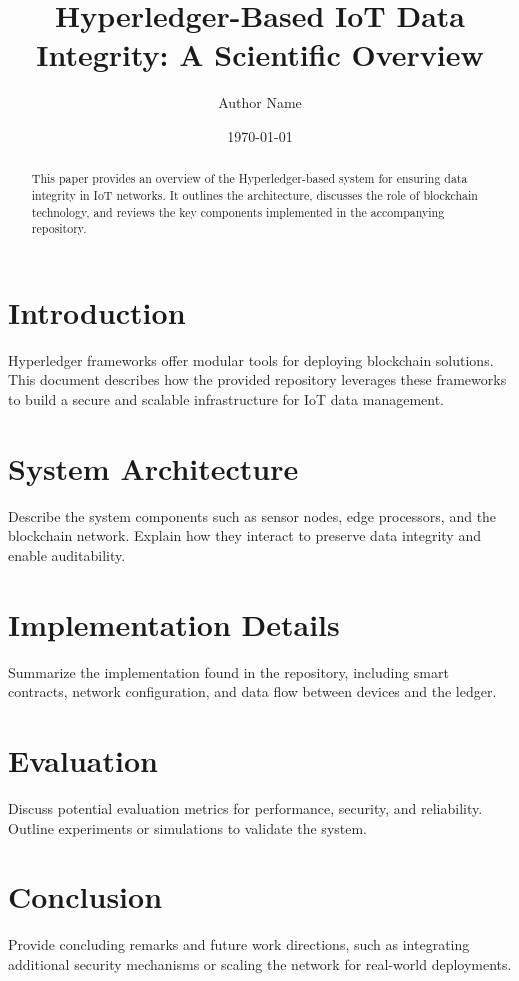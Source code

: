 \documentclass{article}
\title{Hyperledger-Based IoT Data Integrity: A Scientific Overview}
\author{Author Name}
\date{\today}
\begin{document}
\maketitle

\begin{abstract}
This paper provides an overview of the Hyperledger-based system for ensuring data integrity in IoT networks. It outlines the architecture, discusses the role of blockchain technology, and reviews the key components implemented in the accompanying repository.
\end{abstract}

\section{Introduction}
Hyperledger frameworks offer modular tools for deploying blockchain solutions. This document describes how the provided repository leverages these frameworks to build a secure and scalable infrastructure for IoT data management.

\section{System Architecture}
Describe the system components such as sensor nodes, edge processors, and the blockchain network. Explain how they interact to preserve data integrity and enable auditability.

\section{Implementation Details}
Summarize the implementation found in the repository, including smart contracts, network configuration, and data flow between devices and the ledger.

\section{Evaluation}
Discuss potential evaluation metrics for performance, security, and reliability. Outline experiments or simulations to validate the system.

\section{Conclusion}
Provide concluding remarks and future work directions, such as integrating additional security mechanisms or scaling the network for real-world deployments.



\end{document}

